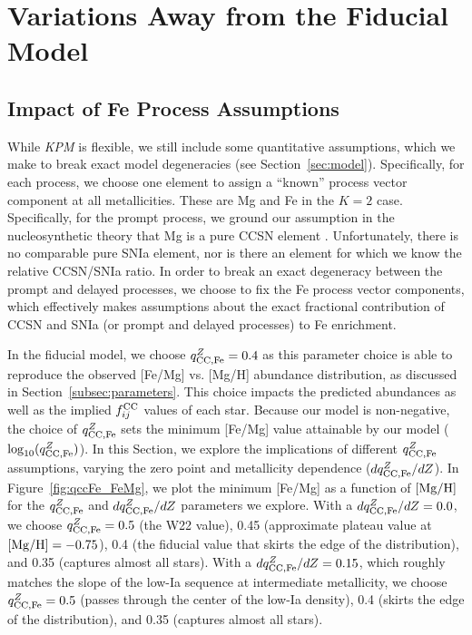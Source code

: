 \documentclass[modern, linenumbers]{aastex631}
\newcommand{\mgh}{[{\rm Mg}/{\rm H}]}
\newcommand{\qccFe}{q_{{\rm CC, Fe}}^{Z}}
\newcommand{\dqccFe}{dq_{{\rm CC, Fe}}^{Z}/dZ}
\newcommand{\fcc}{f_{ij}^{\rm CC}}
\newcommand{\name}{\textsl{KPM}}
\begin{document}
\section{Variations Away from the Fiducial Model} \label{sec:variations}

\subsection{Impact of Fe Process Assumptions} \label{subsec:qccFe}

While \name{} is flexible, we still include some quantitative assumptions, which we make to break exact model degeneracies (see Section~\ref{sec:model}).
Specifically, for each process, we choose one element to assign a ``known'' process vector component at all metallicities.
These are Mg and Fe in the $K=2$ case.
Specifically, for the prompt process, we ground our assumption in the nucleosynthetic theory that Mg is a pure CCSN element \citep[e.g.,][]{andrews2017}.
Unfortunately, there is no comparable pure SNIa element, nor is there an element for which we know the relative CCSN/SNIa ratio.
In order to break an exact degeneracy between the prompt and delayed processes, we choose to fix the Fe process vector components, which effectively makes assumptions about the exact fractional contribution of CCSN and SNIa (or prompt and delayed processes) to Fe enrichment.

In the fiducial model, we choose $\qccFe = 0.4$ as this parameter choice is able to reproduce the observed [Fe/Mg] vs. [Mg/H] abundance distribution, as discussed in Section~\ref{subsec:parameters}. This choice impacts the predicted abundances as well as the implied $\fcc$ values of each star. Because our model is non-negative, the choice of $\qccFe$ sets the minimum [Fe/Mg] value attainable by our model ($\log_{10}(\qccFe)$). In this Section, we explore the implications of different $\qccFe$ assumptions, varying the zero point and metallicity dependence ($\dqccFe$). In Figure~\ref{fig:qccFe_FeMg}, we plot the minimum [Fe/Mg] as a function of $\mgh$ for the $\qccFe$ and $\dqccFe$ parameters we explore. With a $\dqccFe=0.0$, we choose $\qccFe=0.5$ (the W22 value), 0.45 (approximate plateau value at $\mgh=-0.75$), 0.4 (the fiducial value that skirts the edge of the distribution), and 0.35 (captures almost all stars). With a $\dqccFe=0.15$, which roughly matches the slope of the low-Ia sequence at intermediate metallicity, we choose $\qccFe=0.5$ (passes through the center of the low-Ia density), 0.4 (skirts the edge of the distribution), and 0.35 (captures almost all stars).
\end{document}
